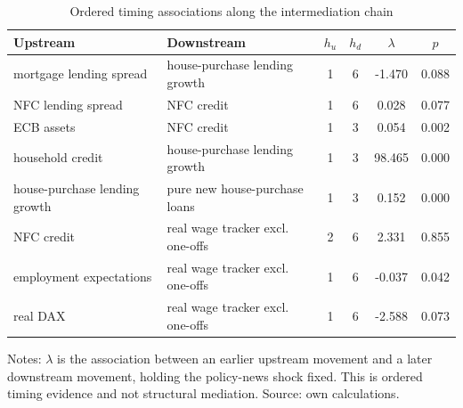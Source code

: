 \begin{table}[htbp]
  \centering
  \caption{Ordered timing associations along the intermediation chain}
  \label{tab:sequential-transmission}
  \footnotesize
  \setlength{\tabcolsep}{5pt}
  \begin{tabular}{@{}ll S[table-format=1.0] S[table-format=1.0] S[table-format=-2.3] S[table-format=1.3]@{}}
    \toprule
    Upstream & Downstream &  &  &  &  \\
    \midrule
    mortgage lending spread & house-purchase lending growth & 1 & 6 & -1.470 & 0.088 \\
    NFC lending spread & NFC credit & 1 & 6 & 0.028 & 0.077 \\
    ECB assets & NFC credit & 1 & 3 & 0.054 & 0.002 \\
    household credit & house-purchase lending growth & 1 & 3 & 98.465 & 0.000 \\
    house-purchase lending growth & pure new house-purchase loans & 1 & 3 & 0.152 & 0.000 \\
    NFC credit & real wage tracker excl. one-offs & 2 & 6 & 2.331 & 0.855 \\
    employment expectations & real wage tracker excl. one-offs & 1 & 6 & -0.037 & 0.042 \\
    real DAX & real wage tracker excl. one-offs & 1 & 6 & -2.588 & 0.073 \\
    \bottomrule
  \end{tabular}
  \vspace{0.3em}
  \begin{minipage}{\textwidth}\footnotesize{}
  Notes: $\lambda$ is the association between an earlier upstream movement and a
  later downstream movement, holding the policy-news shock fixed. This is ordered
  timing evidence and not structural mediation.
  Source: own calculations.
  \end{minipage}
\end{table}
